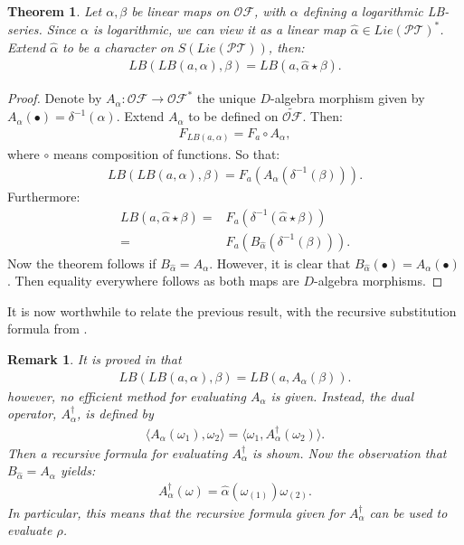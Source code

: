 \documentclass[10pt,a4paper]{article}
\newtheorem{theorem}{Theorem}[section]
\newtheorem{remark}{Remark}
\begin{document}
\begin{theorem}
Let $\alpha,\beta$ be linear maps on $\mathcal{OF}$, with $\alpha$ defining a logarithmic LB-series. Since $\alpha$ is logarithmic, we can view it as a linear map $\hat{\alpha}\in Lie(\mathcal{PT})^{\ast}$. Extend $\hat{\alpha}$ to be a character on $S(Lie(\mathcal{PT}))$, then:
\begin{align*}
LB(LB(a,\alpha),\beta)=LB(a,\hat{\alpha} \star\beta).
\end{align*}
\end{theorem}

\begin{proof}
Denote by $A_{\alpha}: \mathcal{OF} \to \mathcal{OF}^{\ast}$ the unique $D$-algebra morphism given by $A_{\alpha}(\bullet)=\delta^{-1}(\alpha)$. Extend $A_{\alpha}$ to be defined on $\widetilde{\mathcal{OF}}$. Then:
\begin{align*}
F_{LB(a,\alpha)}=F_a \circ A_{\alpha},
\end{align*}
where $\circ$ means composition of functions. So that:
\begin{align*}
LB(LB(a,\alpha),\beta)=F_a(A_{\alpha}(\delta^{-1}(\beta))).
\end{align*}
Furthermore:
\begin{align*}
LB(a,\hat{\alpha} \star \beta)=&F_a(\delta^{-1}(\hat{\alpha} \star \beta))\\
=&F_a(B_{\hat{\alpha}}(\delta^{-1}(\beta))).
\end{align*}
Now the theorem follows if $B_{\hat{\alpha}}=A_{\alpha}$. However, it is clear that $B_{\hat{\alpha}}(\bullet)=A_{\alpha}(\bullet)$. Then equality everywhere follows as both maps are $D$-algebra morphisms.
\end{proof}

It is now worthwhile to relate the previous result, with the recursive substitution formula from \cite{LundervoldMunthe-Kaas2011}.

\begin{remark}
It is proved in \cite{LundervoldMunthe-Kaas2011} that
\begin{align*}
LB(LB(a,\alpha),\beta)=LB(a,A_{\alpha}(\beta)). 
\end{align*}
however, no efficient method for evaluating $A_{\alpha}$ is given. Instead, the dual operator, $A_{\alpha}^\dagger$, is defined by
\begin{align*}
\langle A_{\alpha}(\omega_1),\omega_2 \rangle = \langle \omega_1,A_{\alpha}^\dagger(\omega_2) \rangle.
\end{align*}
Then a recursive formula for evaluating $A_{\alpha}^\dagger$ is shown. Now the observation that $B_{\hat{\alpha}}=A_{\alpha}$ yields:
\begin{align*}
A_{\alpha}^\dagger(\omega)=\hat{\alpha}(\omega_{(1)})\omega_{(2)}.
\end{align*}
In particular, this means that the recursive formula given for $A_{\alpha}^\dagger$ can be used to evaluate $\rho$.
\end{remark}
\end{document}

